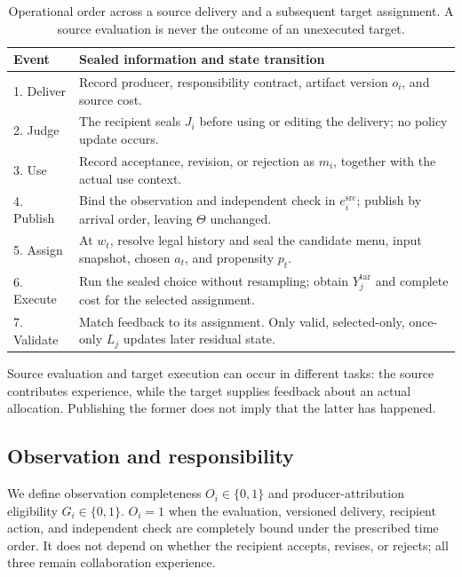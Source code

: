 \documentclass[sigconf,anonymous]{aamas}
\begin{document}
\begin{table}[t]
\centering\small
\begin{tabular}{@{}p{}p{}@{}}
\toprule
Event & Sealed information and state transition \\
\midrule
1. Deliver & Record producer, responsibility contract, artifact version $o_i$, and source cost. \\
2. Judge & The recipient seals $J_i$ before using or editing the delivery; no policy update occurs. \\
3. Use & Record acceptance, revision, or rejection as $m_i$, together with the actual use context. \\
4. Publish & Bind the observation and independent check in $e_i^{\mathrm{src}}$; publish by arrival order, leaving $\Theta$ unchanged. \\
5. Assign & At $w_t$, resolve legal history and seal the candidate menu, input snapshot, chosen $a_t$, and propensity $p_t$. \\
6. Execute & Run the sealed choice without resampling; obtain $Y_j^{\mathrm{tar}}$ and complete cost for the selected assignment. \\
7. Validate & Match feedback to its assignment. Only valid, selected-only, once-only $L_j$ updates later residual state. \\
\bottomrule
\end{tabular}
\caption{Operational order across a source delivery and a subsequent target assignment. A source evaluation is never the outcome of an unexecuted target.}
\label{tab:event-order}
\end{table}

Source evaluation and target execution can occur in different tasks: the source contributes experience, while the target supplies feedback about an actual allocation. Publishing the former does not imply that the latter has happened.

\subsection{Observation and responsibility}
We define observation completeness $O_i\in\{0,1\}$ and producer-attribution eligibility $G_i\in\{0,1\}$. $O_i=1$ when the evaluation, versioned delivery, recipient action, and independent check are completely bound under the prescribed time order. It does not depend on whether the recipient accepts, revises, or rejects; all three remain collaboration experience.
\end{document}
